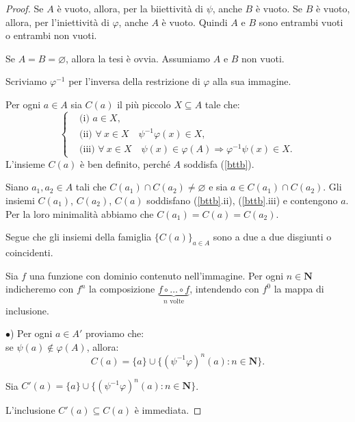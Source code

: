 \documentclass[a4paper,oneside,11pt]{book}
\theoremstyle{definition} \newtheorem{Def}{Definizione}
\theoremstyle{plain} \newtheorem{teo}{Teorema}
\theoremstyle{plain} \newtheorem{cor}[teo]{Corollario}
\theoremstyle{definition} \newtheorem{lem}[teo]{Lemma}
\theoremstyle{plain} \newtheorem{pro}[teo]{Proposizione}
\newcommand{\ug}[1]{(\ref{#1})} %
\begin{document}
	\begin{proof}
		Se $A$ è vuoto, allora, per la biiettività di $\psi$, anche $B$ è vuoto. Se $B$ è vuoto, allora, per l'iniettività di $\varphi$, anche $A$ è vuoto. Quindi $A$ e $B$ sono entrambi vuoti o entrambi non vuoti.
		
		Se $A = B = \varnothing$, allora la tesi è ovvia. Assumiamo $A$ e $B$ non vuoti.
		
		Scriviamo $\varphi^{-1}$ per l'inversa della restrizione di $\varphi$ alla sua immagine.
		
		Per ogni $a \in A$ sia $C(a)$ il più piccolo $X \subseteq A$ tale che:
		\begin{equation}\label{bttb}
			\left\{\begin{aligned}
				&\text{(i) } a \in X \text{,}\\
				&\text{(ii) } \forall\ x \in X \quad \psi^{-1}\varphi(x) \in X \text{,}\\
				&\text{(iii) } \forall\ x \in X \quad \psi(x) \in \varphi(A) \Rightarrow \varphi^{-1}\psi(x) \in X \text{.}
			\end{aligned}\right.
		\end{equation}
		L'insieme $C(a)$ è ben definito, perché $A$ soddisfa \ug{bttb}.
		
		Siano $a_1, a_2 \in A$ tali che $C(a_1) \cap C(a_2) \neq \varnothing$ e sia $a \in C(a_1) \cap C(a_2)$. Gli insiemi $C(a_1)$, $C(a_2)$, $C(a)$ soddisfano (\ref{bttb}.ii), (\ref{bttb}.iii) e contengono $a$. Per la loro minimalità abbiamo che $C(a_1) = C(a) = C(a_2)$.
		
		Segue che gli insiemi della famiglia $\{C(a)\}_{a \in A}$ sono a due a due disgiunti o coincidenti.
		
		Sia $f$ una funzione con dominio contenuto nell'immagine. Per ogni $n \in \mathbf{N}$ indicheremo con $f^n$ la composizione $\underbrace{f \circ \dots \circ f}_{n \text{ volte}}$, intendendo con $f^0$ la mappa di inclusione.
		
		$ $\\
		$\bullet$) Per ogni $a \in A'$ proviamo che:\\
		se $\psi(a) \notin \varphi(A)$, allora:
		\begin{equation*}
			C(a) = \{a\} \cup \{(\psi^{-1}\varphi)^n(a) : n \in \mathbf{N}\} \text{.}
		\end{equation*}
		
		Sia $C'(a) = \{a\} \cup \{(\psi^{-1}\varphi)^n(a) : n \in \mathbf{N}\}$.
		
		L'inclusione $C'(a) \subseteq C(a)$ è immediata.
				

\end{proof}
\end{document}
